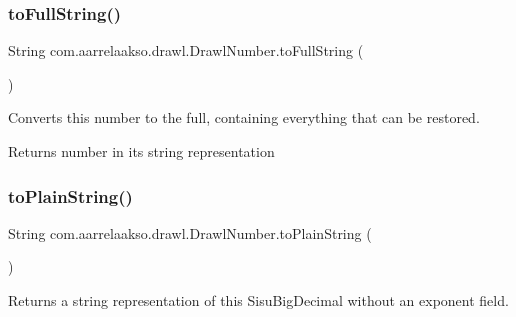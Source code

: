 \subsubsection{\texorpdfstring{to\+Full\+String()}{toFullString()}}
{\footnotesize\ttfamily String com.\+aarrelaakso.\+drawl.\+Drawl\+Number.\+to\+Full\+String (\begin{DoxyParamCaption}{ }\end{DoxyParamCaption})\hspace{0.3cm}{\ttfamily [protected]}}



Converts this number to the full, containing everything that can be restored. 

\begin{DoxyReturn}{Returns}
number in it\textquotesingle{}s string representation 
\end{DoxyReturn}
\mbox{\label{classcom_1_1aarrelaakso_1_1drawl_1_1_drawl_number_a07c4c1c3a0e81ae9aef3325bef3e0152}} 
\subsubsection{\texorpdfstring{to\+Plain\+String()}{toPlainString()}}
{\footnotesize\ttfamily String com.\+aarrelaakso.\+drawl.\+Drawl\+Number.\+to\+Plain\+String (\begin{DoxyParamCaption}{ }\end{DoxyParamCaption})\hspace{0.3cm}{\ttfamily [protected]}}

\begin{DoxyReturn}{Returns}
a string representation of this Sisu\+Big\+Decimal without an exponent field. 
\end{DoxyReturn}
\mbox{\label{classcom_1_1aarrelaakso_1_1drawl_1_1_drawl_number_a24775bf5217d477c4b39149596210184}} 
